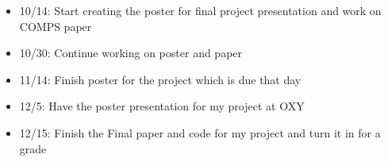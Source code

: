 \documentclass[10pt,twocolumn]{article}
\begin{document}
\begin{itemize}
    \item 10/14: Start creating the poster for final project presentation and work on COMPS paper
    \item 10/30: Continue working on poster and paper
    \item 11/14: Finish poster for the project which is due that day
    \item 12/5: Have the poster presentation for my project at OXY
    \item 12/15: Finish the Final paper and code for my project and turn it in for a grade
\end{itemize}


\printbibliography 
\end{document}
